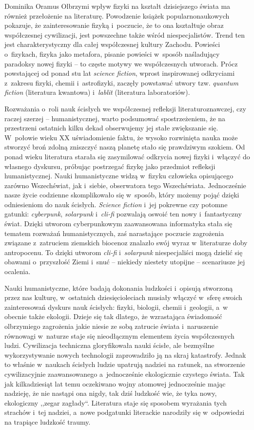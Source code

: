 \begin{artplenv}{Dominika Oramus}
Olbrzymi wpływ fizyki na kształt dzisiejszego świata ma również przełożenie na literaturę. Powodzenie książek popularnonaukowych pokazuje, że zainteresowanie fizyką i~poczucie, że to ona kształtuje obraz współczesnej cywilizacji, jest powszechne także wśród niespecjalistów. Trend ten jest charakterystyczny dla całej współczesnej kultury Zachodu. Powieści o~fizykach, fizyka jako metafora, pisanie powieści w~sposób naśladujący paradoksy nowej fizyki -- to częste motywy we współczesnych utworach. Prócz powstającej od ponad stu lat \textit{science fiction}, wprost inspirowanej odkryciami z~zakresu fizyki, chemii i~astrofizyki, zaczęły powstawać utwory tzw. \textit{quantum fiction} (literatura kwantowa) i~\textit{lablit} (literatura laboratoriów).

Rozważania o~roli nauk ścisłych we współczesnej refleksji literaturoznawczej, czy raczej szerzej -- humanistycznej, warto podsumować spostrzeżeniem, że na przestrzeni ostatnich kilku dekad obserwujemy jej stałe zwiększanie się. W~połowie wieku XX uświadomienie faktu, że wysoko rozwinięta nauka może stworzyć broń zdolną zniszczyć naszą planetę stało się prawdziwym szokiem. Od ponad wieku literatura starała się zasymilować odkrycia nowej fizyki i~włączyć do własnego dyskursu, próbując postrzegać fizykę jako przedmiot refleksji humanistycznej. Nauki humanistyczne widzą w~fizyku człowieka opisującego zarówno Wszechświat, jak i~siebie, obserwatora tego Wszechświata. Jednocześnie nasze życie codzienne skomplikowało się w~sposób, który możemy pojąć dzięki odniesieniom do nauk ścisłych. \textit{Science fiction} i~jej pokrewne czy potomne gatunki: \textit{cyberpunk}, \textit{solarpunk} i~\textit{cli-fi} pozwalają oswoić ten nowy i~fantastyczny świat. Dzięki utworom cyberpunkowym zaawansowana informatyka stała się tematem rozważań humanistycznych, zaś narastające poczucie zagrożenia związane z~zatruciem ziemskich biocenoz znalazło swój wyraz w~literaturze doby antropocenu. To dzięki utworom \textit{cli-fi} i~\textit{solarpunk} niespecjaliści mogą dzielić się obawami o~przyszłość Ziemi i~snuć -- niekiedy niestety utopijne -- scenariusze jej ocalenia.

Nauki humanistyczne, które badają dokonania ludzkości i~opisują stworzoną przez nas kulturę, w~ostatnich dziesięcioleciach musiały włączyć w~sferę swoich zainteresowań dyskurs nauk ścisłych: fizyki, biologii, chemii i~geologii, a~w obecnie także ekologii. Dzieje się tak dlatego, że wzrastająca świadomość olbrzymiego zagrożenia jakie niesie ze sobą zatrucie świata i~naruszenie równowagi w~naturze staje się nieodłącznym elementem życia współczesnych ludzi. Cywilizacja techniczna gloryfikowała nauki ścisłe, ale bezmyślne wykorzystywanie nowych technologii zaprowadziło ją na skraj katastrofy. Jednak to właśnie w~naukach ścisłych ludzie upatrują nadziei na ratunek, na stworzenie cywilizacyjnie zaawansowanego a~jednocześnie ekologicznie czystego świata. Tak jak kilkadziesiąt lat temu oczekiwano wojny atomowej jednocześnie mając nadzieję, że nie nastąpi ona nigdy, tak dziś ludzkość wie, że tyka nowy, ekologiczny ,,zegar zagłady``. Literatura staje się sposobem wyrażania tych strachów i~tej nadziei, a~nowe podgatunki literackie narodziły się w~odpowiedzi na trapiące ludzkość traumy.


\end{artplenv}
